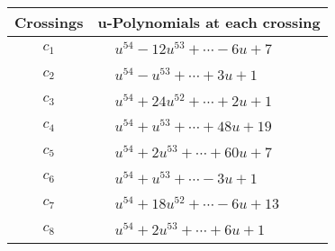 \documentclass[1p]{elsarticle_modified}
\theoremstyle{definition}
\begin{document}
\begin{tabular}{m{50pt}|m{274pt}}
Crossings & \hspace{64pt}u-Polynomials at each crossing \\
\hline $$\begin{aligned}c_{1}\end{aligned}$$&$\begin{aligned}
&u^{54}-12 u^{53}+\cdots-6 u+7
\end{aligned}$\\
\hline $$\begin{aligned}c_{2}\end{aligned}$$&$\begin{aligned}
&u^{54}- u^{53}+\cdots+3 u+1
\end{aligned}$\\
\hline $$\begin{aligned}c_{3}\end{aligned}$$&$\begin{aligned}
&u^{54}+24 u^{52}+\cdots+2 u+1
\end{aligned}$\\
\hline $$\begin{aligned}c_{4}\end{aligned}$$&$\begin{aligned}
&u^{54}+u^{53}+\cdots+48 u+19
\end{aligned}$\\
\hline $$\begin{aligned}c_{5}\end{aligned}$$&$\begin{aligned}
&u^{54}+2 u^{53}+\cdots+60 u+7
\end{aligned}$\\
\hline $$\begin{aligned}c_{6}\end{aligned}$$&$\begin{aligned}
&u^{54}+u^{53}+\cdots-3 u+1
\end{aligned}$\\
\hline $$\begin{aligned}c_{7}\end{aligned}$$&$\begin{aligned}
&u^{54}+18 u^{52}+\cdots-6 u+13
\end{aligned}$\\
\hline $$\begin{aligned}c_{8}\end{aligned}$$&$\begin{aligned}
&u^{54}+2 u^{53}+\cdots+6 u+1
\end{aligned}$\\

\end{tabular}
\end{document}

